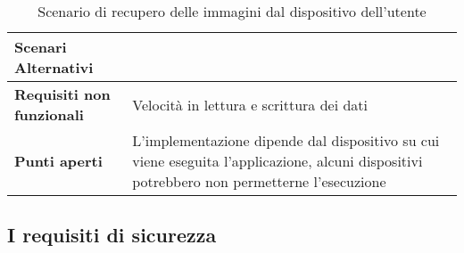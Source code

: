 \begin{table}[htb]
\begin{tabular} {|P{4.5cm}|P{11cm}|}
        \hline
        \textbf{Scenari Alternativi}      &                                                                                                                                            \\
        \hline
        \textbf{Requisiti non funzionali} & Velocità in lettura e scrittura dei dati                                                                                                   \\
        \hline
        \textbf{Punti aperti}             & L'implementazione dipende dal dispositivo su cui viene eseguita l'applicazione, alcuni dispositivi potrebbero non permetterne l'esecuzione \\
        \hline
    \end{tabular}


    \caption{Scenario di recupero delle immagini dal dispositivo dell'utente}
\end{table}

\clearpage
\subsection{I requisiti di sicurezza}

